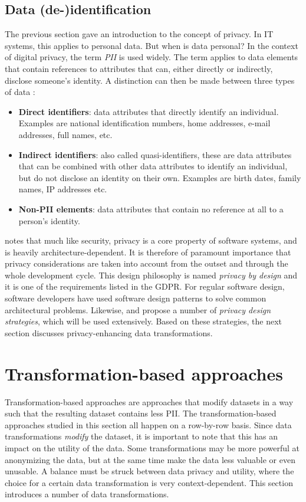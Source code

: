 \subsection{Data (de-)identification}
\label{sec:data-deid}
The previous section gave an introduction to the concept of privacy. In IT systems, this applies to personal data. But when is data personal? In the context of digital privacy, the term \textit{\gls{PII}} is used widely. The term applies to data elements that contain references to attributes that can, either directly or indirectly, disclose someone's identity. A distinction can then be made between three types of data \citep{de-id-taxonomy}:
\begin{itemize}
    \item \textbf{Direct identifiers}: data attributes that directly identify an individual. Examples are national identification numbers, home addresses, e-mail addresses, full names, etc.
    \item \textbf{Indirect identifiers}: also called quasi-identifiers, these are data attributes that can be combined with other data attributes to identify an individual, but do not disclose an identity on their own. Examples are birth dates, family names, IP addresses etc.
    \item \textbf{Non-PII elements}: data attributes that contain no reference at all to a person's identity.
\end{itemize}
\noindent \citeauthor{privacy-design-strategies} notes that much like security, privacy is a core property of software systems, and is heavily architecture-dependent. It is therefore of paramount importance that privacy considerations are taken into account from the outset and through the whole development cycle. This design philosophy is named \textit{privacy by design} and it is one of the requirements listed in the GDPR. For regular software design, software developers have used software design patterns to solve common architectural problems. Likewise, \citet{privacy-design-strategies} and \citet{de-id-taxonomy} propose a number of \textit{privacy design strategies}, which will be used extensively. Based on these strategies, the next section discusses privacy-enhancing data transformations.

\section{Transformation-based approaches}
\label{sec:transformation-approaches}
Transformation-based approaches are approaches that modify datasets in a way such that the resulting dataset contains less \gls{PII}. The transformation-based approaches studied  in this section all happen on a row-by-row basis. Since data transformations \textit{modify} the dataset, it is important to note that this has an impact on the utility of the data. Some transformations may be more powerful at anonymizing the data, but at the same time make the data less valuable or even unusable. A balance must be struck between data privacy and utility, where the choice for a certain data transformation is very context-dependent. This section introduces a number of data transformations.

